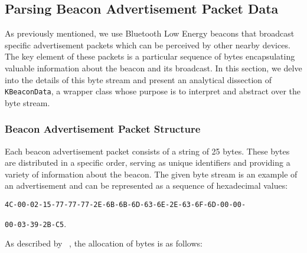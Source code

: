 \subsection{Parsing Beacon Advertisement Packet Data}

As previously mentioned, we use Bluetooth Low Energy beacons that broadcast specific advertisement packets which can be perceived by other nearby devices.
The key element of these packets is a particular sequence of bytes encapsulating valuable information about the beacon and its broadcast. 
In this section, we delve into the details of this byte stream and present an analytical dissection of \texttt{KBeaconData}, a wrapper class whose purpose is to interpret and abstract over the byte stream.

\subsubsection{Beacon Advertisement Packet Structure}
	 
Each beacon advertisement packet consists of a string of 25 bytes.
These bytes are distributed in a specific order, serving as unique identifiers and providing a variety of information about the beacon. 
The given byte stream is an example of an advertisement and can be represented as a sequence of hexadecimal values:


\noindent\texttt{4C-00-02-15-77-77-77-2E-6B-6B-6D-63-6E-2E-63-6F-6D-00-00-}


\noindent\texttt{00-03-39-2B-C5}.


As described by \citeauthor{apple2023ibeacon}~\cite{apple2023ibeacon}, the allocation of bytes is as follows:

